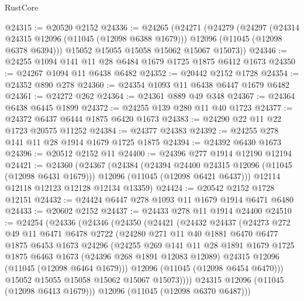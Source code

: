 \begin{lexlean}{RustCore}
\begin{coremodule}
@24315 := @20520 @2152
@24336 := @24265
    (@24271
      (@24279
        (@24297
          (@24314 @24315 @12096 (@11045 (@12098 @6388 @1679)))
          @12096
          (@11045 (@12098 @6378 @6394)))
        @15052
        @15055
        @15058
        @15062
        @15067
        @15073))
@24346 := @24255 @1094 @141 @11 @28 @6484 @1679 @1725 @1875 @6412 @1673
@24350 := @24267 @1094 @11 @6438 @6482
@24352 := @20442 @2152 @1728
@24354 := @24352 @890 @278
@24360 := @24354 @1093 @11 @6438 @6447 @1679 @6482
@24361 := @24272 @262
@24364 := @24361 @889 @49 @348
@24367 := @24364 @6438 @6445 @1899
@24372 := @24255 @139 @280 @11 @40 @1723
@24377 := @24372 @6437 @6444 @1875 @6420 @1673
@24383 := @24290 @22 @11 @22 @1723 @20575 @11252
@24384 := @24377 @24383
@24392 := @24255 @278 @141 @11 @28 @1914 @1679 @1725 @1875
@24394 := @24392 @6430 @1673
@24396 := @20512 @2152 @11
@24400 := @24396 @277 @1914 @12190 @12194
@24421 := @24360
    (@24367
      (@24384
        (@24394 @24400 @24315 @12096 (@11045 (@12098 @6431 @1679)))
        @12096
        (@11045 (@12098 @6421 @6437)))
      @12114
      @12118
      @12123
      @12128
      @12134
      @13359)
@24424 := @20542 @2152 @1728 @12151
@24432 := @24424 @6447 @278 @1093 @11 @1679 @1914 @6471 @6480
@24433 := @20602 @2152
@24437 := @24433 @278 @11 @1914 @24400
@24510 := @24254
    (@24336
      (@24346
        (@24350
          (@24421
            (@24432
              @24437
              (@24273
                @272
                @49
                @11
                @6471
                @6478
                @2722
                (@24280
                  @271
                  @11
                  @40
                  @1881
                  @6470
                  @6477
                  @1875
                  @6453
                  @1673
                  @24296
                  (@24255
                    @269
                    @141
                    @11
                    @28
                    @1891
                    @1679
                    @1725
                    @1875
                    @6463
                    @1673
                    (@24396 @268 @1891 @12083 @12089)
                    @24315
                    @12096
                    (@11045 (@12098 @6464 @1679)))
                  @12096
                  (@11045 (@12098 @6454 @6470)))
                @15052
                @15055
                @15058
                @15062
                @15067
                @15073))))
        @24315
        @12096
        (@11045 (@12098 @6413 @1679)))
      @12096
      (@11045 (@12098 @6370 @6487)))

\end{coremodule}
\end{lexlean}

